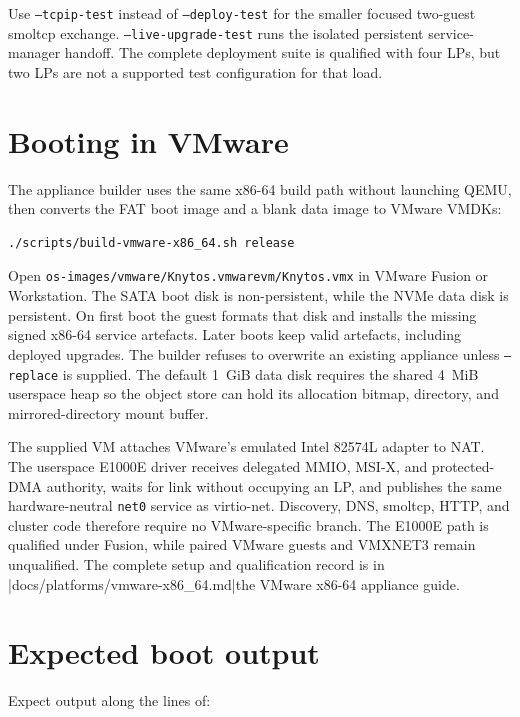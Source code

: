 Use \texttt{--tcpip-test} instead of \texttt{--deploy-test} for the smaller
focused two-guest smoltcp exchange. \texttt{--live-upgrade-test} runs the isolated
persistent service-manager handoff. The complete deployment suite is qualified
with four LPs, but two LPs are not a supported test configuration for that load.

\section{Booting in VMware}

The appliance builder uses the same x86-64 build path without launching QEMU,
then converts the FAT boot image and a blank data image to VMware VMDKs:

\begin{verbatim}
./scripts/build-vmware-x86_64.sh release
\end{verbatim}

Open
\texttt{os-images/vmware/Knytos.vmwarevm/Knytos.vmx} in VMware
Fusion or Workstation. The SATA boot disk is non-persistent, while the NVMe data disk
is persistent. On first boot the guest formats that disk and installs the
missing signed x86-64 service artefacts. Later boots keep valid artefacts,
including deployed upgrades. The builder refuses to overwrite an existing
appliance unless \texttt{--replace} is supplied. The default 1~GiB data disk
requires the shared 4~MiB userspace heap so the object store can hold its
allocation bitmap, directory, and mirrored-directory mount buffer.

The supplied VM attaches VMware's emulated Intel 82574L adapter to NAT. The
userspace E1000E driver receives delegated MMIO, MSI-X, and protected-DMA
authority, waits for link without occupying an LP, and publishes the same
hardware-neutral \texttt{net0} service as virtio-net. Discovery, DNS, smoltcp,
HTTP, and cluster code therefore require no VMware-specific branch. The E1000E
path is qualified under Fusion, while paired VMware guests and VMXNET3 remain
unqualified. The complete setup and qualification record is in
\repofiletext|docs/platforms/vmware-x86_64.md|{the VMware x86-64 appliance guide}.

\section{Expected boot output}

Expect output along the lines of:

